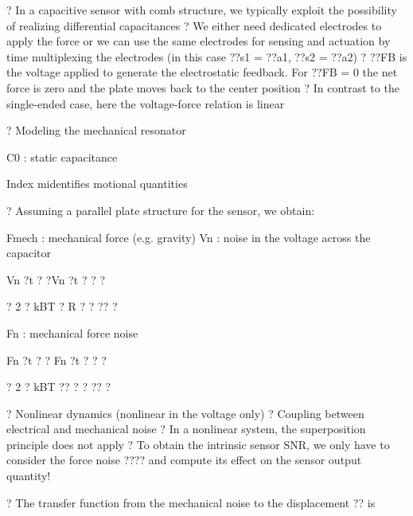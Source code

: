 \documentclass[2pt,landscape]{article}
\begin{document}
\begin{multicols*}{5}
?	In a capacitive sensor with comb structure, we typically exploit the 
possibility of realizing differential capacitances
?	We either need dedicated electrodes to apply the force or we can use the 
same electrodes for sensing and actuation by time multiplexing the 
electrodes (in this case ??s1 = ??a1, ??s2 = ??a2)
?	??FB is the voltage applied to generate the electrostatic feedback. For ??FB = 
0 the net force is zero and the plate moves back to the center position
?	In contrast to the single-ended case, here the voltage-force relation is linear



?	Modeling the mechanical resonator
















C0 : static capacitance


Index \textbullet m\textbullet identifies motional quantities











?	Assuming a parallel plate structure for the sensor, we obtain:



Fmech : mechanical force (e.g. gravity)
Vn : noise in the voltage across the capacitor



Vn ?t ? ?Vn ?t ? ? ?



? 2 ? kBT ? R ? ? ?? ?


Fn : mechanical force noise


Fn ?t ? ? Fn ?t ? ? ?


? 2 ? kBT ?? ? ? ?? ?



?	Nonlinear dynamics (nonlinear in the voltage only)
?	Coupling between electrical and mechanical noise
?	In a nonlinear system, the superposition principle does not apply
?	To obtain the intrinsic sensor SNR, we only have to consider the force 
noise ???? and compute its effect on the sensor output quantity!



?	The transfer function from the mechanical noise to the displacement ?? is






\end{multicols*}
\end{document}
